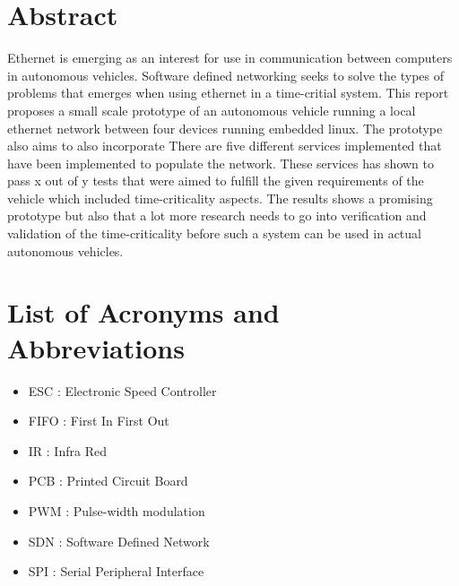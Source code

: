 \documentclass[11pt, titlepage]{article} %
\begin{document}

\clearpage
\section*{Abstract}
Ethernet is emerging as an interest for use in communication between computers in autonomous vehicles. 
Software defined networking seeks to solve the types of problems that emerges when using ethernet in a time-critial system.
This report proposes a small scale prototype of an autonomous vehicle running a local ethernet network between four devices running embedded linux.
The prototype also aims to also incorporate 
There are five different services implemented that have been implemented to populate the network.
These services has shown to pass x out of y tests that were aimed to fulfill the given requirements of the vehicle which included time-criticality aspects.
The results shows a promising prototype but also that a lot more research needs to go into verification and validation of the time-criticality before such a system can be used in actual autonomous vehicles.





\clearpage
\tableofcontents

\clearpage
\listoffigures

\clearpage
\listoftables

\clearpage
\section*{List of Acronyms and Abbreviations}
\begin{itemize}
        \item ESC : Electronic Speed Controller
        \item FIFO : First In First Out
        \item IR : Infra Red
        \item PCB : Printed Circuit Board
	\item PWM : Pulse-width modulation
	\item SDN : Software Defined Network
	\item SPI : Serial Peripheral Interface
\end{itemize}
\end{document}
